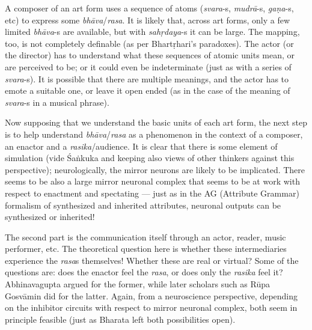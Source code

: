 A composer of an art form uses a sequence of atoms (\textsl{svara}-s, \hbox{\textsl{mudrā}-s}, \textsl{gaṇa}-s, etc) to express some \textsl{bhāva}/\textsl{rasa}. It is likely that, across art forms, only a few limited \textsl{bhāva}-s are available, but with \textsl{sahṛdaya}-s it can be large. The mapping, too, is not completely definable (as per Bhartṛhari’s paradoxes). The actor (or the director) has to understand what these sequences of atomic units mean, or are perceived to be; or it could even be indeterminate (just as with a series of \textsl{svara}-s). It is possible that there are multiple meanings, and the actor has to emote a suitable one, or leave it open ended (as in the case of the meaning of \textsl{svara}-s in a musical phrase).

Now supposing that we understand the basic units of each art form, the next step is to help understand \textsl{bhāva}/\textsl{rasa} as a phenomenon in the context of a composer, an enactor and a \textsl{rasika}/audience. It is clear that there is some element of simulation (vide Śaṅkuka and keeping also views of other thinkers against this perspective); neurologically, the mirror neurons are likely to be implicated. There seems to be also a large mirror neuronal complex that seems to be at work with respect to enactment and spectating --- just as in the AG (Attribute Grammar) formalism of synthesized and inherited attributes, neuronal outputs can be synthesized or inherited!

The second part is the communication itself through an actor, reader, music performer, etc. The theoretical question here is whether these intermediaries experience the \textsl{rasa}s themselves! Whether these are real or virtual? Some of the questions are: does the enactor feel the \textsl{rasa}, or does only the \textsl{rasika} feel it? Abhinavagupta argued for the former, while later scholars such as Rūpa Gosvāmin did for the latter. Again, from a neuroscience perspective, depending on the inhibitor circuits with respect to mirror neuronal complex, both seem in principle feasible (just as Bharata left both possibilities open).
\eject

